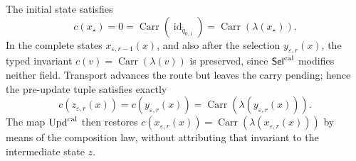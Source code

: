 The initial state satisfies
\[
 c(x_\star)=0=\operatorname{Carr}
   (\operatorname{id}_{\widetilde q_{0,1}})
   =\operatorname{Carr}(\lambda(x_\star)).
\]
In the complete states \(x_{\varepsilon,r-1}(x)\), and also after the
selection \(y_{\varepsilon,r}(x)\), the typed invariant
\(c(v)=\operatorname{Carr}(\lambda(v))\) is preserved, since
\(\mathsf{Sel}^{\rm cal}\) modifies neither field. Transport advances the
route but leaves the carry pending; hence the pre-update tuple satisfies
exactly
\[
 c(z_{\varepsilon,r}(x))=c(y_{\varepsilon,r}(x))
 =\operatorname{Carr}(\lambda(y_{\varepsilon,r}(x))).
\]
The map \(\operatorname{Upd}^{\rm cal}\) then restores
\(c(x_{\varepsilon,r}(x))=
\operatorname{Carr}(\lambda(x_{\varepsilon,r}(x)))\) by means of the
composition law, without attributing that invariant to the intermediate state \(z\).

